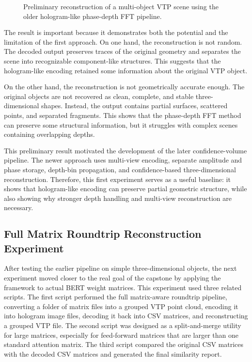 \documentclass{article}
\begin{document}
\begin{normalsize}
\begin{figure}[H]
    \caption{Preliminary reconstruction of a multi-object VTP scene using the older hologram-like phase-depth FFT pipeline.}
    \label{fig:old_pipeline_simple_objects}
\end{figure}

The result is important because it demonstrates both the potential and the limitation of the first approach. On one hand, the reconstruction is not random. The decoded output preserves traces of the original geometry and separates the scene into recognizable component-like structures. This suggests that the hologram-like encoding retained some information about the original VTP object.

On the other hand, the reconstruction is not geometrically accurate enough. The original objects are not recovered as clean, complete, and stable three-dimensional shapes. Instead, the output contains partial surfaces, scattered points, and separated fragments. This shows that the phase-depth FFT method can preserve some structural information, but it struggles with complex scenes containing overlapping depths.

This preliminary result motivated the development of the later confidence-volume pipeline. The newer approach uses multi-view encoding, separate amplitude and phase storage, depth-bin propagation, and confidence-based three-dimensional reconstruction. Therefore, this first experiment serves as a useful baseline: it shows that hologram-like encoding can preserve partial geometric structure, while also showing why stronger depth handling and multi-view reconstruction are necessary.

\subsection{Full Matrix Roundtrip Reconstruction Experiment}

After testing the earlier pipeline on simple three-dimensional objects, the next experiment moved closer to the real goal of the capstone by applying the framework to actual BERT weight matrices. This experiment used three related scripts. The first script performed the full matrix-aware roundtrip pipeline, converting a folder of matrix files into a grouped VTP point cloud, encoding it into hologram image files, decoding it back into CSV matrices, and reconstructing a grouped VTP file. The second script was designed as a split-and-merge utility for large matrices, especially for feed-forward matrices that are larger than one standard attention matrix. The third script compared the original CSV matrices with the decoded CSV matrices and generated the final similarity report.


\end{normalsize}
\end{document}
